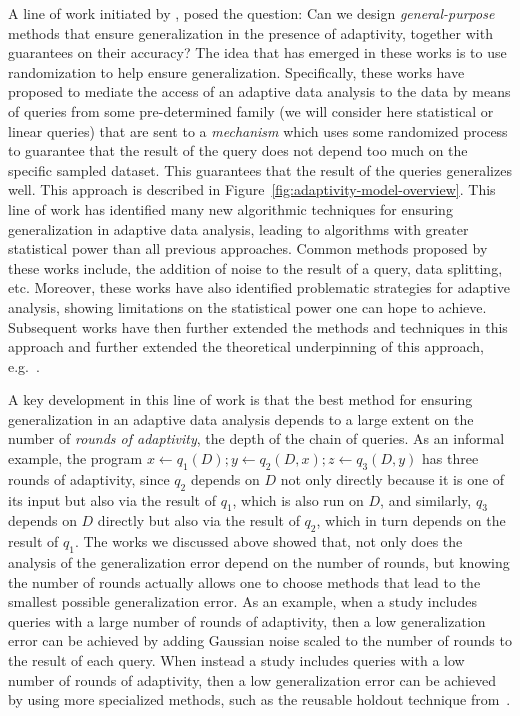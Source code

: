 A line of work initiated by \citet{DworkFHPRR15}, \citet{HardtU14} posed the question: Can we design \emph{general-purpose} methods that ensure generalization in the presence of adaptivity, together with guarantees on their accuracy?  The idea that has emerged in these works is to use randomization to help ensure generalization. Specifically, these works have proposed to mediate the access of an adaptive data analysis to the data by means of queries from some pre-determined family (we will consider here statistical or linear queries) that are sent to a  \emph{mechanism} which uses some randomized process to guarantee that the result of the query does not depend too much on the specific
sampled dataset. This guarantees that the result of the queries generalizes well. This approach is described in Figure~\ref{fig:adaptivity-model-overview}.  
This line of work has identified many new algorithmic techniques for ensuring generalization in adaptive data analysis, leading to algorithms with greater statistical power than all previous approaches. Common methods proposed by these works include, the addition of noise to the result of a query, data splitting, etc. Moreover, these works have also identified problematic strategies for adaptive analysis, showing limitations on the statistical power one can hope to achieve. Subsequent works have then further extended the methods and techniques in this approach and further extended the theoretical underpinning of this approach, e.g.~\cite{dwork2015reusable,dwork2015generalization,BassilyNSSSU16,UllmanSNSS18,FeldmanS17,jung2019new,SteinkeZ20,RogersRSSTW20}.
%

A key development in this line of work is that the best method for ensuring generalization in an adaptive data analysis depends to a large extent on the number of \emph{rounds of adaptivity}, the depth of the chain of queries. As an informal example, the program $x \leftarrow q_1(D);y \leftarrow q_2(D,x);z \leftarrow q_3(D,y)$ has three rounds of adaptivity, since $q_2$  depends on $D$ not only directly because it is one of its input but also via the result of $q_1$, which is also run on $D$, and similarly,  $q_3$ depends on $D$ directly but also via the result of $q_2$, which in turn depends on the result of $q_1$. The works we discussed above showed that, not only does the analysis of the generalization error depend on the number of rounds, but knowing the number of rounds actually allows one to choose methods that lead to the smallest possible generalization error. As an example, when a study includes queries with a large number of rounds of adaptivity, then a low generalization error can be achieved by adding Gaussian noise scaled to the number of rounds to the result of each query.
When instead a study includes queries with a low number of rounds of adaptivity, then a low generalization error can be achieved by using more specialized methods, such as the reusable holdout technique from~\citet{DworkFHPRR15}. 




